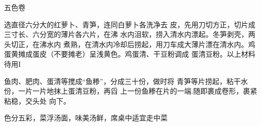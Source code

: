 \begin{recipe}{五色卷}

\ingredients



\cooking

\step 选直径六分大的红萝卜、青笋，连同白萝卜各洗净去 皮，先用刀切方正，切片成三寸长、六分宽的薄片各六片，在沸 水内沮软，捞入清水内漂起。冬笋剥壳，两头切正，在沸水内 煮熟，在清水内冷却后捞起，用刀车成大薄片漂在清水内。鸡 蛋黄摊成蛋皮（不要摊老）呈浅黄色。鸡蛋清、干豆粉调成 蛋清豆粉。以上材料待用I

\step 鱼肉、肥肉、蛋清等搅成“鱼糁”，分成三十份，做时将 青笋等片捞起，粘干水份，一片一片地抹上蛋清豆粉，再舀 上一份鱼糁在片的一端.随即裹成卷形，裹紧粘稳，交头处 向下。

\notes

色分五彩，菜浮汤面，味美汤鲜，席桌中适宜走中菜

\end{recipe}

